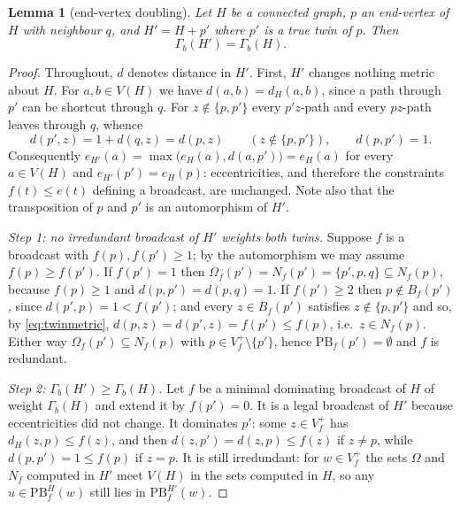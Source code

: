 \documentclass[11pt]{amsart}
\newtheorem{lemma}[theorem]{Lemma}
\theoremstyle{remark}
\newcommand{\Gb}{\Gamma_{b}}
\newcommand{\PB}{\mathrm{PB}}
\begin{document}
\begin{lemma}[end-vertex doubling]\label{lem:double}
Let $H$ be a connected graph, $p$ an end-vertex of $H$ with neighbour $q$, and
$H'=H+p'$ where $p'$ is a true twin of $p$. Then
\[
 \Gb(H')=\Gb(H).
\]
\end{lemma}

\begin{proof}
Throughout, $d$ denotes distance in $H'$. First, $H'$ changes nothing metric
about $H$. For $a,b\in V(H)$ we have $d(a,b)=d_H(a,b)$, since a path through
$p'$ can be shortcut through $q$. For $z\notin\{p,p'\}$ every $p'z$-path and
every $pz$-path leaves through $q$, whence
\begin{equation}\label{eq:twinmetric}
 d(p',z)=1+d(q,z)=d(p,z)\qquad(z\notin\{p,p'\}),\qquad d(p,p')=1 .
\end{equation}
Consequently $e_{H'}(a)=\max\bigl(e_H(a),d(a,p')\bigr)=e_H(a)$ for every
$a\in V(H)$ and $e_{H'}(p')=e_H(p)$: eccentricities, and therefore the
constraints $f(t)\le e(t)$ defining a broadcast, are unchanged. Note also that
the transposition of $p$ and $p'$ is an automorphism of $H'$.

\emph{Step 1: no irredundant broadcast of $H'$ weights both twins.} Suppose $f$
is a broadcast with $f(p),f(p')\ge1$; by the automorphism we may assume
$f(p)\ge f(p')$. If $f(p')=1$ then
$\Omega_f(p')=N_f(p')=\{p',p,q\}\subseteq N_f(p)$, because $f(p)\ge1$ and
$d(p,p')=d(p,q)=1$. If $f(p')\ge2$ then $p\notin B_f(p')$, since
$d(p',p)=1<f(p')$; and every $z\in B_f(p')$ satisfies $z\notin\{p,p'\}$ and so,
by \eqref{eq:twinmetric}, $d(p,z)=d(p',z)=f(p')\le f(p)$, i.e.\ $z\in N_f(p)$.
Either way $\Omega_f(p')\subseteq N_f(p)$ with $p\in V_f^{+}\setminus\{p'\}$,
hence $\PB_f(p')=\emptyset$ and $f$ is redundant.

\emph{Step 2: $\Gb(H')\ge\Gb(H)$.} Let $f$ be a minimal dominating broadcast of
$H$ of weight $\Gb(H)$ and extend it by $f(p')=0$. It is a legal broadcast of
$H'$ because eccentricities did not change. It dominates $p'$: some
$z\in V_f^{+}$ has $d_H(z,p)\le f(z)$, and then $d(z,p')=d(z,p)\le f(z)$ if
$z\ne p$, while $d(p,p')=1\le f(p)$ if $z=p$. It is still irredundant: for
$w\in V_f^{+}$ the sets $\Omega$ and $N_f$ computed in $H'$ meet $V(H)$ in the
sets computed in $H$, so any $u\in\PB_f^{H}(w)$ still lies in $\PB_f^{H'}(w)$.


\end{proof}
\end{document}
